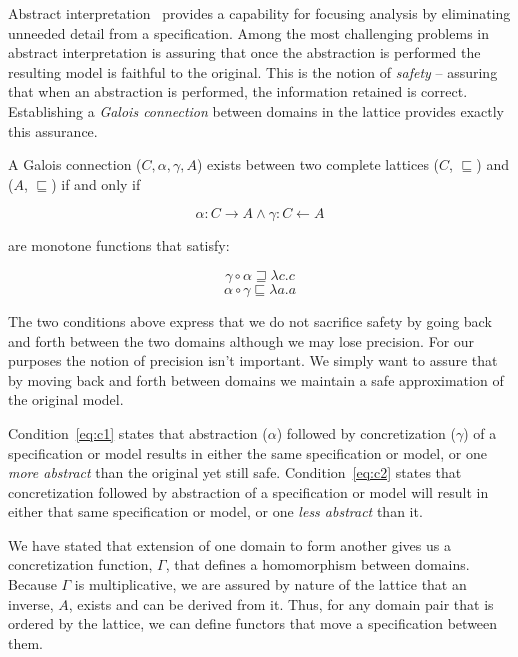 \documentclass[12pt]{article}
\begin{document}
Abstract interpretation~\cite{Cousot:00:Abstract-Interp} provides a
capability for focusing analysis by eliminating unneeded detail from a
specification.  Among the most challenging problems in abstract
interpretation is assuring that once the abstraction is performed the
resulting model is faithful to the original. This is the notion of
\emph{safety} -- assuring that when an abstraction is performed, the
information retained is correct.  Establishing a \emph{Galois
  connection} \cite{Nielson:05:Principles-of-P} between domains in the
lattice provides exactly this assurance.

A Galois connection ($C,\alpha,\gamma,A$) exists between two complete
lattices ($C$, $\sqsubseteq$) and ($A$, $\sqsubseteq$) if and only if

\[\alpha:C \rightarrow A \wedge \gamma:C \leftarrow A\]

\noindent are monotone functions that satisfy:

\begin{equation}
\label{eq:c1}
\gamma \circ \alpha \sqsupseteq \lambda c.c
\end{equation}
\begin{equation}
\label{eq:c2}
\alpha \circ \gamma \sqsubseteq \lambda a.a
\end{equation}

The two conditions above express that we do not sacrifice safety by
going back and forth between the two domains although we may lose
precision.  For our purposes the notion of precision isn't important.
We simply want to assure that by moving back and forth between domains
we maintain a safe approximation of the original model.

Condition~\ref{eq:c1} states that abstraction ($\alpha$) followed by
concretization ($\gamma$) of a specification or model results in
either the same specification or model, or one \emph{more abstract}
than the original yet still safe.  Condition~\ref{eq:c2} states that
concretization followed by abstraction of a specification or model will result
in either that same specification or model, or one \emph{less abstract} than
it.

We have stated that extension of one domain to form another gives us a
concretization function, $\Gamma$, that defines a homomorphism between
domains.  Because $\Gamma$ is multiplicative, we are assured by nature
of the lattice that an inverse, $A$, exists and can be derived from
it.  Thus, for any domain pair that is ordered by the lattice, we can
define functors that move a specification between them.
\end{document}
